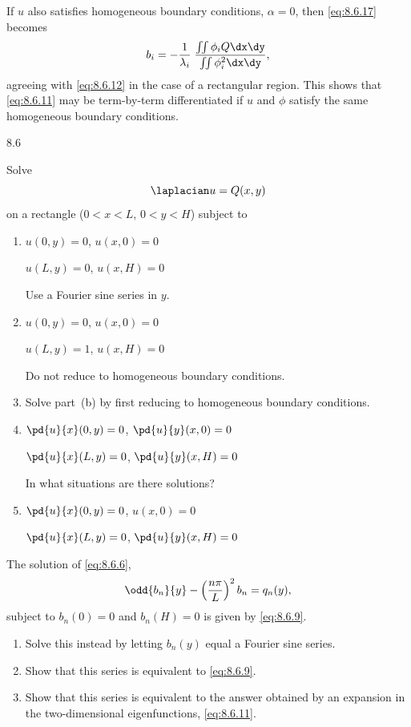 If $u$ also satisfies homogeneous boundary conditions, $\alpha = 0$, then \eqref{eq:8.6.17} becomes
\[
b_i = -\frac{1}{\lambda_i}\;\frac{\iint \phi_i Q\dx\dy}{\iint \phi_i^2\dx\dy},
\]
agreeing with \eqref{eq:8.6.12} in the case of a rectangular region.  This shows that \eqref{eq:8.6.11} may be term-by-term differentiated if $u$ and $\phi$ satisfy the same homogeneous boundary conditions.

\begin{exercises}{8.6}

\item Solve
\[
\laplacian u = Q(x,y)
\]
on a rectangle ($0 < x < L$, $0 < y < H$) subject to
\begin{enumerate}
\item[(a)] $u(0,y) = 0$, \quad $u(x,0) = 0$
\par $u(L,y) = 0$, \quad $u(x,H) = 0$
\par Use a Fourier sine series in $y$.
\item[\starred(b)] $u(0,y) = 0$, \quad $u(x,0) = 0$
\par $u(L,y) = 1$, \quad $u(x,H) = 0$
\par Do not reduce to homogeneous boundary conditions.
\item[(c)] Solve part~(b) by first reducing to homogeneous boundary conditions.
\item[\starred(d)] $\pd{u}{x}(0,y) = 0$, \quad $\pd{u}{y}(x,0) = 0$
\par $\pd{u}{x}(L,y) = 0$, \quad $\pd{u}{y}(x,H) = 0$
\par In what situations are there solutions?
\item[(e)] $\pd{u}{x}(0,y) = 0$, \quad $u(x,0) = 0$
\par $\pd{u}{x}(L,y) = 0$, \quad $\pd{u}{y}(x,H) = 0$
\end{enumerate}

\item The solution of \eqref{eq:8.6.6},
\[
\odd{b_n}{y} - \left(\frac{n\pi}{L}\right)^2 b_n = q_n(y),
\]
subject to $b_n(0) = 0$ and $b_n(H) = 0$ is given by \eqref{eq:8.6.9}.
\begin{enumerate}
\item[(a)] Solve this instead by letting $b_n(y)$ equal a Fourier sine series.
\item[(b)] Show that this series is equivalent to \eqref{eq:8.6.9}.
\item[(c)] Show that this series is equivalent to the answer obtained by an expansion in the two-dimensional eigenfunctions, \eqref{eq:8.6.11}.
\end{enumerate}


\end{exercises}
